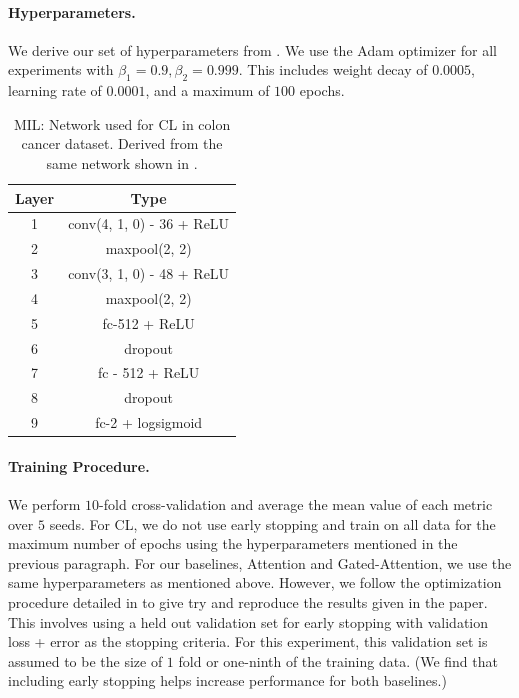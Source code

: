 \documentclass{article}
\begin{document}
\paragraph{Hyperparameters.} We derive our set of hyperparameters from \citet{ilse2018attention}. We use the Adam optimizer for all experiments with $\beta_1 = 0.9, \beta_2 = 0.999$. This includes weight decay of $0.0005$, learning rate of $0.0001$, and a maximum of $100$ epochs.

\begin{table}[h]
    \centering
    \caption{MIL: Network used for CL in colon cancer dataset. Derived from the same network shown in \citet{ilse2018attention}.}
    \begin{tabular}{c|c}
        \toprule
         Layer & Type\\
         \midrule
         1 & conv(4, 1, 0) - 36 + ReLU\\
         2 & maxpool(2, 2)\\
         3 & conv(3, 1, 0) - 48 + ReLU\\
         4 & maxpool(2, 2)\\
         5 & fc-512 + ReLU\\
         6 & dropout\\
         7 & fc - 512 + ReLU\\
         8 & dropout\\
         9 & fc-2 + logsigmoid\\
        \bottomrule
    \end{tabular}

\end{table}


\paragraph{Training Procedure.} We perform $10$-fold cross-validation and average the mean value of each metric over $5$ seeds. For CL, we do not use early stopping and train on all data for the maximum number of epochs using the hyperparameters mentioned in the previous paragraph. For our baselines, Attention and Gated-Attention, we use the same hyperparameters as mentioned above. However, we follow the optimization procedure detailed in \citet{ilse2018attention} to give try and reproduce the results given in the paper. This involves using a held out validation set for early stopping with validation loss + error as the stopping criteria. For this experiment, this validation set is assumed to be the size of $1$ fold or one-ninth of the training data. (We find that including early stopping helps increase performance for both baselines.)
\end{document}
